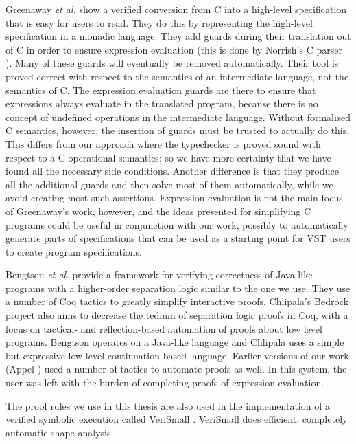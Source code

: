 \documentclass{puthesis}
\begin{document}
Greenaway \emph{et al.} \cite{greenaway12} show a verified conversion
from C into a high-level specification that is easy for users to
read. They do this by representing the high-level specification in a
monadic language.  They add guards during their translation out of C
in order to ensure expression evaluation (this is done by Norrish's C
parser \cite{norrish:parser}). Many of these guards will eventually be
removed automatically. Their tool is proved correct with respect to
the semantics of an intermediate language, not the semantics of C. The
expression evaluation guards are there to ensure that expressions
always evaluate in the translated program, because there is no concept
of undefined operations in the intermediate language.  Without
formalized C semantics, however, the insertion of guards must be
trusted to actually do this. This differs from our approach where the
typechecker is proved sound with respect to a C operational semantics;
so we have more certainty that we have found all the necessary side
conditions.  Another difference is that they produce all the
additional guards and then solve most of them automatically, while we
avoid creating most such assertions. Expression evaluation is not the
main focus of Greenaway's work, however, and the ideas presented for
simplifying C programs could be useful in conjunction with our work,
possibly to automatically generate parts of specifications that can be
used as a starting point for VST users to create program
specifications.

Bengtson \emph{et al.} \cite{bengtson12:Charge} provide a framework for verifying
correctness of Java-like programs with a higher-order separation logic similar
to the one we use. They use a number of Coq tactics to greatly simplify
interactive proofs. Chlipala's Bedrock project
\cite{chlipala11:pldi} also aims to decrease the tedium of separation logic
proofs in Coq, with a focus on tactical- and reflection-based 
automation of proofs about low level programs. Bengtson operates on a Java-like
language and Chlipala uses a simple but expressive low-level
continuation-based language.
Earlier versions of our
work (Appel \cite{appel06}) used a number of
tactics to automate proofs as well. In this system, the user was left with the
burden of completing proofs of expression evaluation.

The proof rules we use in this thesis are also used in the implementation of a
verified symbolic execution called VeriSmall \cite{appel11:cpp}. 
VeriSmall does efficient, completely automatic 
shape analysis.  
\end{document}

